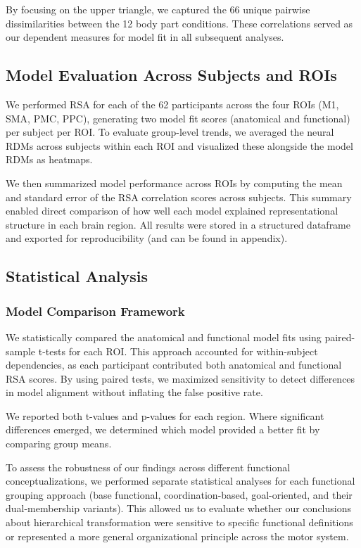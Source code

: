 \documentclass{article}
\begin{document}
By focusing on the upper triangle, we captured the 66 unique pairwise dissimilarities between the 12 body part conditions. These correlations served as our dependent measures for model fit in all subsequent analyses.

\subsection{Model Evaluation Across Subjects and ROIs}
We performed RSA for each of the 62 participants across the four ROIs (M1, SMA, PMC, PPC), generating two model fit scores (anatomical and functional) per subject per ROI. To evaluate group-level trends, we averaged the neural RDMs across subjects within each ROI and visualized these alongside the model RDMs as heatmaps.

We then summarized model performance across ROIs by computing the mean and standard error of the RSA correlation scores across subjects. This summary enabled direct comparison of how well each model explained representational structure in each brain region. All results were stored in a structured dataframe and exported for reproducibility (and can be found in appendix).

\subsection{Statistical Analysis}
\subsubsection{Model Comparison Framework}
We statistically compared the anatomical and functional model fits using paired-sample t-tests for each ROI. This approach accounted for within-subject dependencies, as each participant contributed both anatomical and functional RSA scores. By using paired tests, we maximized sensitivity to detect differences in model alignment without inflating the false positive rate.

We reported both t-values and p-values for each region. Where significant differences emerged, we determined which model provided a better fit by comparing group means.

To assess the robustness of our findings across different functional conceptualizations, we performed separate statistical analyses for each functional grouping approach (base functional, coordination-based, goal-oriented, and their dual-membership variants). This allowed us to evaluate whether our conclusions about hierarchical transformation were sensitive to specific functional definitions or represented a more general organizational principle across the motor system.
\end{document}
